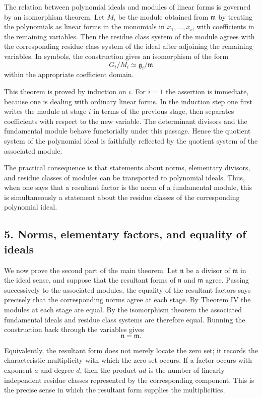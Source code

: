 \documentclass[11pt]{article}
\begin{document}
The relation between polynomial ideals and modules of linear forms is governed by an isomorphism theorem. Let $M_i$ be the module obtained from $\mathfrak m$ by treating the polynomials as linear forms in the monomials in $x_1,
\ldots,x_i$, with coefficients in the remaining variables. Then the residue class system of the module agrees with the corresponding residue class system of the ideal after adjoining the remaining variables. In symbols, the construction gives an isomorphism of the form
\[
  G_i/M_i \simeq \mathfrak g_i/\mathfrak m
\]
within the appropriate coefficient domain.

This theorem is proved by induction on $i$. For $i=1$ the assertion is immediate, because one is dealing with ordinary linear forms. In the induction step one first writes the module at stage $i$ in terms of the previous stage, then separates coefficients with respect to the new variable. The determinant divisors and the fundamental module behave functorially under this passage. Hence the quotient system of the polynomial ideal is faithfully reflected by the quotient system of the associated module.

The practical consequence is that statements about norms, elementary divisors, and residue classes of modules can be transported to polynomial ideals. Thus, when one says that a resultant factor is the norm of a fundamental module, this is simultaneously a statement about the residue classes of the corresponding polynomial ideal.

\subsection{5. Norms, elementary factors, and equality of ideals}

We now prove the second part of the main theorem. Let $\mathfrak n$ be a divisor of $\mathfrak m$ in the ideal sense, and suppose that the resultant forms of $\mathfrak n$ and $\mathfrak m$ agree. Passing successively to the associated modules, the equality of the resultant factors says precisely that the corresponding norms agree at each stage. By Theorem IV the modules at each stage are equal. By the isomorphism theorem the associated fundamental ideals and residue class systems are therefore equal. Running the construction back through the variables gives
\[
  \mathfrak n=\mathfrak m.
\]

Equivalently, the resultant form does not merely locate the zero set; it records the characteristic multiplicity with which the zero set occurs. If a factor occurs with exponent $a$ and degree $d$, then the product $ad$ is the number of linearly independent residue classes represented by the corresponding component. This is the precise sense in which the resultant form supplies the multiplicities.
\end{document}
